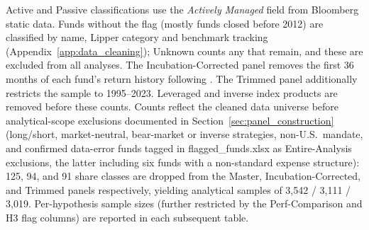 \begin{table}[!htbp]
\centering
\def\sbetab{%
\tablefont
\begin{tabular}[t]{lrrrr}
\toprule
Panel & Active & Passive & Unknown & Total\\
\midrule
Master & 3,266 & 342 & 59 & 3,667\\
Incubation-Corrected & 2,866 & 305 & 34 & 3,205\\
Trimmed (1995--2023) & 2,777 & 299 & 34 & 3,110\\
\bottomrule
\end{tabular}%
}\sbefit
\setlength{\tabletempwidth}{\wd\tabletempbox}
\ifdim\tabletempwidth>\linewidth\setlength{\tabletempwidth}{\linewidth}\fi
\begin{minipage}{\tabletempwidth}
\captionsetup{width=\linewidth}
\caption{\label{tab:fund_counts}Fund Sample Composition by Panel}
\ifdim\wd\tabletempbox>\linewidth
  \resizebox{\linewidth}{!}{\usebox{\tabletempbox}}
\else
  \usebox{\tabletempbox}
\fi
\par\medskip
\begin{singlespace}\tablefont\noindent
Active and Passive classifications use the \textit{Actively Managed} field from Bloomberg static data. Funds without the flag (mostly funds closed before 2012) are classified by name, Lipper category and benchmark tracking (Appendix~\ref{app:data_cleaning}); Unknown counts any that remain, and these are excluded from all analyses. The Incubation-Corrected panel removes the first 36 months of each fund's return history following \textcite{Evans2010}. The Trimmed panel additionally restricts the sample to 1995--2023. Leveraged and inverse index products are removed before these counts. Counts reflect the cleaned data universe before analytical-scope exclusions documented in Section~\ref{sec:panel_construction} (long/short, market-neutral, bear-market or inverse strategies, non-U.S.\ mandate, and confirmed data-error funds tagged in flagged\_funds.xlsx as Entire-Analysis exclusions, the latter including six funds with a non-standard expense structure): 125, 94, and 91 share classes are dropped from the Master, Incubation-Corrected, and Trimmed panels respectively, yielding analytical samples of 3,542 / 3,111 / 3,019. Per-hypothesis sample sizes (further restricted by the Perf-Comparison and H3 flag columns) are reported in each subsequent table.
\end{singlespace}
\end{minipage}
\end{table}

